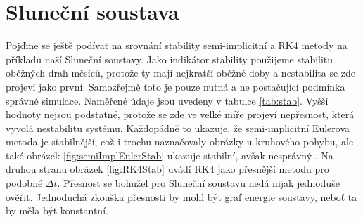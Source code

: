 \section{Sluneční soustava}
Pojďme se ještě podívat na srovnání stability semi-implicitní a RK4 metody na příkladu naší Sluneční soustavy. Jako indikátor stability použijeme stabilitu oběžných drah měsíců, protože ty mají nejkratší oběžné doby a nestabilita se zde projeví jako první. Samozřejmě toto je pouze nutná a ne postačující podmínka správné simulace. Naměřené údaje jsou uvedeny v tabulce \ref{tab:stab}. Vyšší hodnoty nejsou podstatné, protože se zde ve velké míře projeví nepřesnost, která vyvolá nestabilitu systému. Každopádně to ukazuje, že semi-implicitní Eulerova metoda je stabilnější, což i trochu naznačovaly obrázky u kruhového pohybu, ale také obrázek \ref{fig:semiImplEulerStab} ukazuje stabilní, avšak nesprávný . Na druhou stranu obrázek \ref{fig:RK4Stab} uvádí RK4 jako přesnější metodu pro podobné $ \Delta t $. Přesnost se bohužel pro Sluneční soustavu nedá nijak jednoduše ověřit. Jednoduchá zkouška přesnosti by mohl být graf energie soustavy, neboť ta by měla být konstantní.


